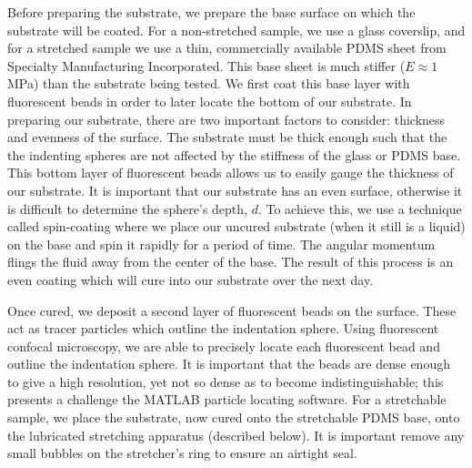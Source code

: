 Before preparing the substrate, we prepare the base surface on which the substrate will be coated. For a non-stretched sample, we use a glass coverslip, and for a stretched sample we use a thin, commercially available PDMS sheet from Specialty Manufacturing Incorporated. This base sheet is much stiffer ($ E\approx 1 $ MPa) than the substrate being tested. We first coat this base layer with fluorescent beads in order to later locate the bottom of our substrate. In preparing our substrate, there are two important factors to consider: thickness and evenness of the surface. The substrate must be thick enough such that the the indenting spheres are not affected by the stiffness of the glass or PDMS base. This bottom layer of fluorescent beads allows us to easily gauge the thickness of our substrate. It is important that our substrate has an even surface, otherwise it is difficult to determine the sphere's depth, $ d $. To achieve this, we use a technique called spin-coating where we place our uncured substrate (when it still is a liquid) on the base and spin it rapidly for a period of time. The angular momentum  flings the fluid away from the center of the base. The result of this process is an even coating which will cure into our substrate over the next day.

Once cured, we deposit a second layer of fluorescent beads on the surface. These act as tracer particles which outline the indentation sphere. Using fluorescent confocal microscopy, we are able to precisely locate each fluorescent bead and outline the indentation sphere. It is important that the beads are dense enough to give a high resolution, yet not so dense as to become indistinguishable; this presents a challenge the MATLAB particle locating software. For a stretchable sample, we place the substrate, now cured onto the stretchable PDMS base, onto the lubricated stretching apparatus (described below). It is important remove any small bubbles on the stretcher's ring to ensure an airtight seal. 

